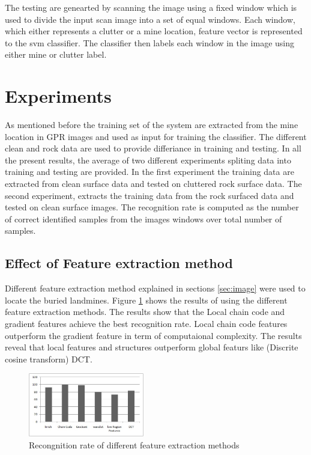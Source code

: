 \documentclass[conference]{IEEEtran}
\begin{document}
The testing are genearted by scanning the image using a fixed window which is used to divide the input scan image into a set of equal windows. Each window, which either represents a clutter or a mine location, feature vector is represented to the svm classifier. The classifier then labels each window in the image using either mine or clutter label.

\section{Experiments}
\label{sec:results}

As mentioned before the training set of the system are extracted from the mine location in GPR images and used as input for training the classifier. The different clean and rock data are used to provide differiance in training and testing. In all the present results, the average of two different experiments spliting data into training and testing are provided. In the first experiment the training data are extracted from clean surface data and tested on cluttered rock surface data. The second experiment, extracts the training data from the rock surfaced data and tested on clean surface images. The recognition rate is computed as the number of correct identified samples from the images windows over total number of samples.
 \subsection{Effect of Feature extraction method}

Different feature extraction method explained in sections \ref{sec:image} were used to locate the buried landmines. Figure \ref{fig:ResultsFeats} shows the results of using the different feature extraction methods. The results show that the Local chain code and gradient features achieve the best recognition rate. Local chain code features outperform the gradient feature in term of computaional complexity.  The results reveal that local features and structures outperform global featurs like (Discrite cosine transform) DCT.

   \begin{figure}
\centering
\label{fig:ResultsFeats}
\includegraphics[width=0.45\textwidth]{images/ResultsFeats.jpg}
 \caption{Recongnition rate of different feature extraction methods }
\end{figure}
\end{document}
